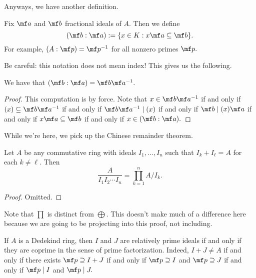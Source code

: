 \documentclass[../notes.tex]{subfiles}
\begin{document}
Anyways, we have another definition.
\begin{defi}
    Fix $\mf a$ and $\mf b$ fractional ideals of $A.$ Then we define
    \[(\mf b:\mf a):=\{x\in K:x\mf a\subseteq\mf b\}.\]
    For example, $(A:\mf p)=\mf p^{-1}$ for all nonzero primes $\mf p.$
\end{defi}
Be careful: this notation does not mean index! This gives us the following.
\begin{lem}
    We have that $(\mf b:\mf a)=\mf b\mf a^{-1}.$
\end{lem}
\begin{proof}
    This computation is by force. Note that $x\in\mf b\mf a^{-1}$ if and only if $(x)\subseteq\mf b\mf a^{-1}$ if and only if $\mf b\mf a^{-1}\mid(x)$ if and only if $\mf b\mid(x)\mf a$ if and only if $x\mf a\subseteq\mf b$ if and only if $x\in(\mf b:\mf a).$
\end{proof}

While we're here, we pick up the Chinese remainder theorem.
\begin{thm}
    Let $A$ be any commutative ring with ideals $I_1,\ldots,I_n$ such that $I_k+I_\ell=A$ for each $k\ne\ell.$ Then
    \[\frac{A}{I_1I_2\cdots I_n}=\prod_{k=1}^nA/I_k.\]
\end{thm}
\begin{proof}
    Omitted.
\end{proof}
Note that $\prod$ is distinct from $\bigoplus.$ This doesn't make much of a difference here because we are going to be projecting into this proof, not including.
\begin{remark}
    If $A$ is a Dedekind ring, then $I$ and $J$ are relatively prime ideals if and only if they are coprime in the sense of prime factorization. Indeed, $I+J\ne A$ if and only if there exists $\mf p\supseteq I+J$ if and only if $\mf p\supseteq I$ and $\mf p\supseteq J$ if and only if $\mf p\mid I$ and $\mf p\mid J.$
\end{remark}
\end{document}

